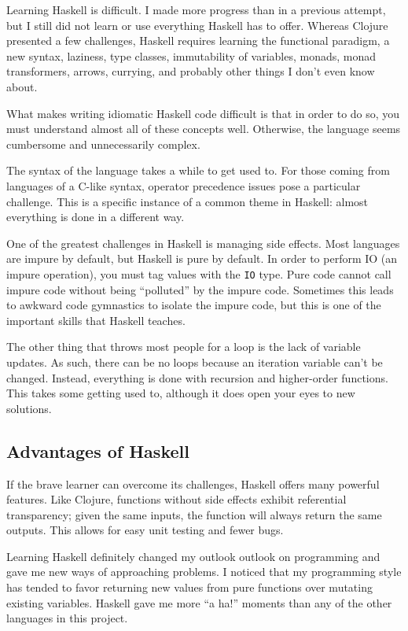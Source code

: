 \documentclass{article}
\begin{document}
Learning Haskell is difficult.  I made more progress than in a previous attempt,
but I still did not learn or use everything Haskell has to offer.  Whereas
Clojure presented a few challenges, Haskell requires learning the functional
paradigm, a new syntax, laziness, type classes, immutability of variables,
monads, monad transformers, arrows, currying, and probably other things I don't
even know about.

What makes writing idiomatic Haskell code difficult is that in order to do so,
you must understand almost all of these concepts well.  Otherwise, the
language seems cumbersome and unnecessarily complex.

The syntax of the language takes a while to get used to.  For those coming from
languages of a C-like syntax, operator precedence issues pose a particular
challenge.  This is a specific instance of a common theme in Haskell: almost
everything is done in a different way.

One of the greatest challenges in Haskell is managing side effects.  Most
languages are impure by default, but Haskell is pure by default.  In order to
perform IO (an impure operation), you must tag values with the \texttt{IO} type.
Pure code cannot call impure code without being ``polluted'' by the impure code.
Sometimes this leads to awkward code gymnastics to isolate the impure code, but
this is one of the important skills that Haskell teaches.

The other thing that throws most people for a loop is the lack of variable
updates.  As such, there can be no loops because an iteration variable can't
be changed.  Instead, everything is done with recursion and higher-order
functions.  This takes some getting used to, although it does open your eyes to
new solutions.

\subsection{Advantages of Haskell}

If the brave learner can overcome its challenges, Haskell offers many powerful
features.  Like Clojure, functions without side effects exhibit referential
transparency; given the same inputs, the function will always return the same
outputs.  This allows for easy unit testing and fewer bugs.

Learning Haskell definitely changed my outlook outlook on programming and gave
me new ways of approaching problems.  I noticed that my programming style has
tended to favor returning new values from pure functions over mutating existing
variables.  Haskell gave me more ``a ha!'' moments than any of the other languages in
this project.
\end{document}
